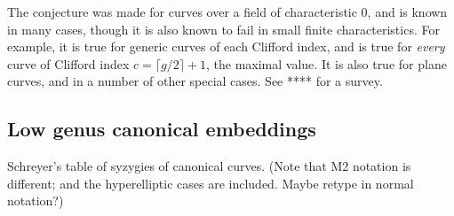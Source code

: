 The conjecture was made for curves over a field of characteristic 0, and is known in many cases, though it is also known to fail in small finite characteristics.
For example, it is true for generic curves of each Clifford index, and is true for \emph{every} curve of  Clifford index $c = \lceil g/2\rceil+1$, the maximal value.
It is also true for plane curves, and in a number of other special cases. See **** for a survey.

\subsection{Low genus canonical embeddings} Schreyer's table of syzygies of canonical curves. (Note that M2 notation is
different; and the hyperelliptic cases are included. Maybe retype in normal notation?)



